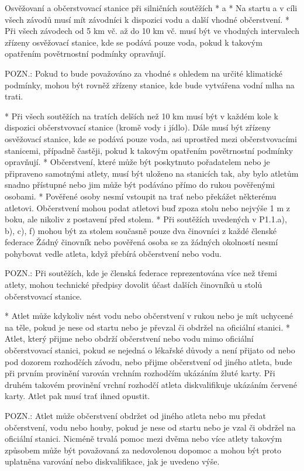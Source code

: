 Osvěžovaní a občerstvovací stanice při silničních soutěžích
* \begitems \style a
  * Na startu a v cíli všech závodů musí mít závodníci k dispozici vodu a další vhodné občerstvení.
  * Při všech závodech od 5 km vč. až do 10 km vč. musí být ve vhodných intervalech zřízeny osvěžovací stanice, kde se podává pouze voda, pokud k takovým opatřením povětrnostní podmínky opravňují.

  POZN.: Pokud to bude považováno za vhodné s ohledem na určité klimatické podmínky, mohou být rovněž zřízeny stanice, kde bude vytvářena vodní mlha na trati.

  * Při všech soutěžích na tratích delších než 10 km musí být v každém kole k dispozici občerstvovací stanice (kromě vody i jídlo). Dále musí být zřízeny osvěžovací stanice, kde se podává pouze voda, asi uprostřed mezi občerstvovacími stanicemi, případně častěji, pokud k takovým opatřením povětrnostní podmínky opravňují.
  * Občerstvení, které může být poskytnuto pořadatelem nebo je připraveno samotnými atlety, musí být uloženo na stanicích tak, aby bylo atletům snadno přístupné nebo jim může být podáváno přímo do rukou pověřenými osobami.
  * Pověřené osoby nesmí vstoupit na trať nebo překážet některému atletovi. Občerstvení mohou podat atletovi buď zpoza stolu nebo nejvýše 1 m z boku, ale nikoliv z postavení před stolem.
  * Při soutěžích uvedených v P1.1.a), b), c), f) mohou být za stolem současně pouze dva činovníci z každé členské federace Žádný činovník nebo pověřená osoba se za žádných okolností nesmí pohybovat vedle atleta, když přebírá občerstvení nebo vodu.

  POZN.: Při soutěžích, kde je členská federace reprezentována více než třemi atlety, mohou technické předpisy dovolit účast dalších činovníků u stolů občerstvovací stanice.

  * Atlet může kdykoliv nést vodu nebo občerstvení v rukou nebo je mít uchycené na těle, pokud je nese od startu nebo je převzal či obdržel na oficiální stanici.
  * Atlet, který přijme nebo obdrží občerstvení nebo vodu mimo oficiální občerstvovací stanici, pokud se nejedná o lékařské důvody a není přijato od nebo pod dozorem rozhodčích závodu, nebo přijme občerstvení od jiného atleta, bude při prvním provinění varován vrchním rozhodčím ukázáním žluté karty. Při druhém takovém provinění vrchní rozhodčí atleta diskvalifikuje ukázáním červené karty. Atlet pak musí trať ihned opustit.

  POZN.: Atlet může občerstvení obdržet od jiného atleta nebo mu předat občerstvení, vodu nebo houby, pokud je nese od startu nebo je vzal či obdržel na oficiální stanici. Nicméně trvalá pomoc mezi dvěma nebo více atlety takovým způsobem může být považovaná za nedovolenou dopomoc a mohou být proto uplatněna varování nebo diskvalifikace, jak je uvedeno výše.
  \enditems

